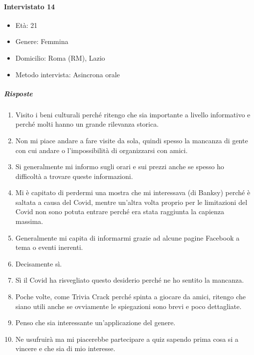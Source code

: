 \documentclass{article}
\begin{document}
\paragraph{Intervistato 14}
\begin{itemize}
\item Età: 21
\item Genere: Femmina
\item Domicilio: Roma (RM), Lazio
\item Metodo intervista: Asincrona orale
\end{itemize}
\subparagraph{Risposte}
\begin{enumerate}
\item Visito i beni culturali perché ritengo che sia importante a livello informativo e perché molti hanno un grande rilevanza storica.
\item Non mi piace andare a fare visite da sola, quindi spesso la mancanza di gente con cui andare o l’impossibilità di organizzarsi con amici.
\item Si generalmente mi informo sugli orari e sui prezzi anche se spesso ho difficoltà a trovare queste informazioni.
\item Mi è capitato di perdermi una mostra che mi interessava (di Banksy) perché è saltata a causa del Covid, mentre un'altra volta proprio per le limitazioni del Covid non sono potuta entrare  perché era stata raggiunta la capienza massima.
\item Generalmente mi capita di informarmi grazie ad alcune pagine Facebook a tema o eventi inerenti.
\item Decisamente sì.
\item Sì il Covid ha risvegliato questo desiderio perché ne ho sentito la mancanza.
\item Poche volte, come Trivia Crack perché spinta a giocare da amici, ritengo che siano utili anche se ovviamente le spiegazioni sono brevi e poco dettagliate.
\item Penso che sia interessante un'applicazione del genere.
\item Ne usufruirà ma mi piacerebbe partecipare a quiz sapendo prima cosa si a vincere e che sia di mio interesse.
\end{enumerate}
\end{document}
